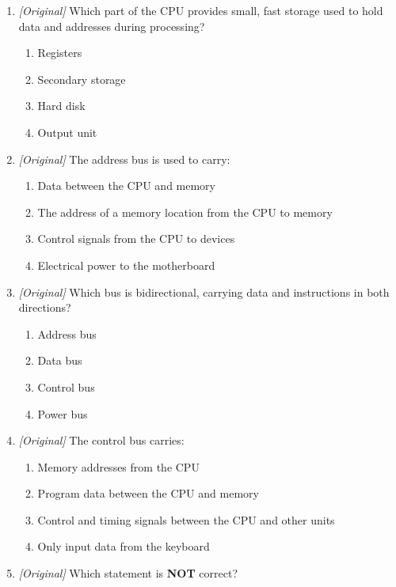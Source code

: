 \begin{enumerate}[label=\textbf{Q\arabic*.}, leftmargin=*]
\begin{enumerate}[label=\Alph*.]
    \item Computer Personal Unit
    \item Central Program Utility
    \item Control Processing Unit
  \end{enumerate}
\item \textit{[Original]} Which part of the CPU provides small, fast storage
  used to hold data and addresses during processing?
  \begin{enumerate}[label=\Alph*.]
    \item Registers
    \item Secondary storage
    \item Hard disk
    \item Output unit
  \end{enumerate}
\item \textit{[Original]} The address bus is used to carry:
  \begin{enumerate}[label=\Alph*.]
    \item Data between the CPU and memory
    \item The address of a memory location from the CPU to memory
    \item Control signals from the CPU to devices
    \item Electrical power to the motherboard
  \end{enumerate}
\item \textit{[Original]} Which bus is bidirectional, carrying data and
  instructions in both directions?
  \begin{enumerate}[label=\Alph*.]
    \item Address bus
    \item Data bus
    \item Control bus
    \item Power bus
  \end{enumerate}
\item \textit{[Original]} The control bus carries:
  \begin{enumerate}[label=\Alph*.]
    \item Memory addresses from the CPU
    \item Program data between the CPU and memory
    \item Control and timing signals between the CPU and other units
    \item Only input data from the keyboard
  \end{enumerate}
\item \textit{[Original]} Which statement is \textbf{NOT} correct?

\end{enumerate}
